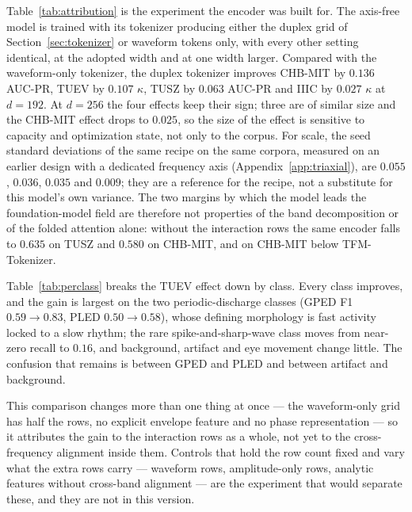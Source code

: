 Table~\ref{tab:attribution} is the experiment the encoder was built for.
The axis-free model is trained with its tokenizer producing either the
duplex grid of Section~\ref{sec:tokenizer} or waveform tokens only, with
every other setting identical, at the adopted width and at one width
larger. Compared with the waveform-only tokenizer, the duplex tokenizer improves
CHB-MIT by $0.136$ AUC-PR, TUEV by $0.107$ $\kappa$, TUSZ by $0.063$ AUC-PR
and IIIC by $0.027$ $\kappa$ at $d{=}192$. At $d{=}256$ the four effects keep their sign; three
are of similar size and the CHB-MIT effect drops to $0.025$, so the size
of the effect is sensitive to capacity and optimization state, not only
to the corpus. For scale, the seed standard deviations of the same
recipe on the same corpora, measured on an earlier design with a
dedicated frequency axis (Appendix~\ref{app:triaxial}), are $0.055$, $0.036$, $0.035$ and $0.009$; they
are a reference for the recipe, not a substitute for this model's own
variance. The two margins by which the model leads the
foundation-model field are therefore not properties of the band
decomposition or of the folded attention alone: without the interaction
rows the same encoder falls to $0.635$ on TUSZ and $0.580$ on CHB-MIT,
and on CHB-MIT below TFM-Tokenizer.

Table~\ref{tab:perclass} breaks the TUEV effect down by class. Every
class improves, and the gain is largest on the two periodic-discharge
classes (GPED F1 $0.59 \to 0.83$, PLED $0.50 \to 0.58$), whose defining
morphology is fast activity locked to a slow rhythm; the rare
spike-and-sharp-wave class moves from near-zero recall to $0.16$, and
background, artifact and eye movement change little. The confusion that
remains is between GPED and PLED and between artifact and background.

This comparison changes more than one thing at once --- the waveform-only
grid has half the rows, no explicit envelope feature and no phase
representation --- so it attributes the gain to the interaction rows as a
whole, not yet to the cross-frequency alignment inside them. Controls
that hold the row count fixed and vary what the extra rows carry ---
waveform rows, amplitude-only rows, analytic features without cross-band
alignment --- are the experiment that would separate these, and they are
not in this version.

